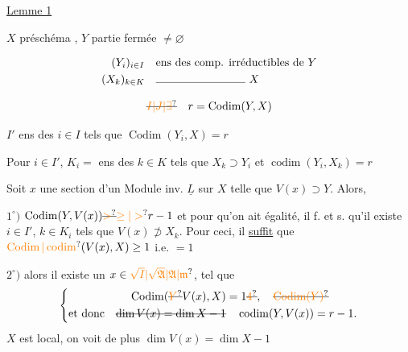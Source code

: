 \uline{Lemme 1}


 $X$ préschéma  , $Y$ partie fermée $\ne\varnothing$

\[
\begin{aligned}
(Y_i)_{i\in I}&\quad\text{ens des comp. irréductibles de }Y\\
(X_k)_{k\in K}&\quad\text{\rule{8em}{0.35pt} }X
\end{aligned}
\]

\[
\deleted{\unsure{I|J|\exists}}\quad r=\operatorname{Codim}(Y,X)
\]

$I'$ ens des $i\in I$ tels que $\operatorname{Codim}(Y_i,X)=r$

Pour $i\in I'$, $K_i=$ ens des $k\in K$ tels que  $X_k\supset Y_i$ et $\operatorname{codim}(Y_i,X_k)=r$

Soit $x$ une section d'un Module inv. $\underline L$ sur $X$ telle que $V(x)\supset Y$. Alors,

$1^\circ)$   $\operatorname{Codim}(Y,V(x))\deleted{\unsure{>}}\unsure{\geq|>}r-1$ et pour qu'on ait égalité, il f. et s. qu'il existe $i\in I'$, $k\in K_i$ tels que $V(x)\not\supset X_k$. Pour ceci, il \uline{suffit} que  $\unsure{\operatorname{Codim}|\operatorname{codim}}(V(x),X)\geq1$  i.e. $=1$ 

$2^\circ)$   alors il existe un $x\in\unsure{\sqrt{I}|\sqrt{\mathfrak A}|\mathfrak A|\mathfrak m}$, tel que
\[
\left\{\begin{aligned}
\operatorname{Codim}(\deleted{\unsure{Y}}V(x),X)&=1\deleted{\unsure{4}},\quad\deleted{\unsure{\operatorname{Codim}(Y)}}\\
\text{et donc}\quad\deleted{\dim V(x)=\dim X-1}&\quad\operatorname{codim}(Y,V(x))=r-1 .
\end{aligned}\right.
\]
$X$ est local, on voit   de plus $\dim V(x)=\dim X-1$


